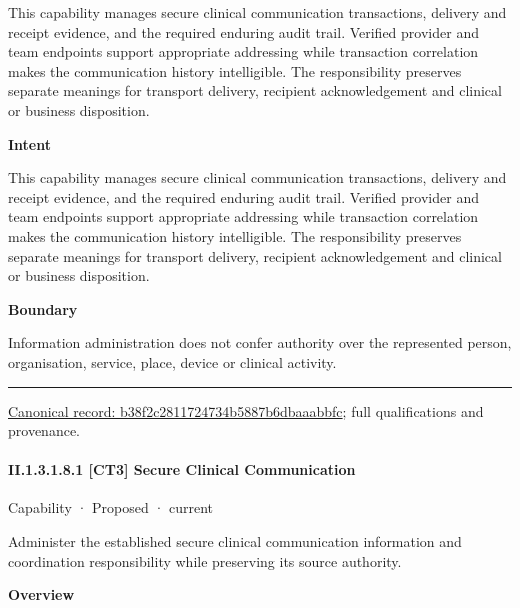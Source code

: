This capability manages secure clinical communication transactions, delivery and receipt evidence, and the required enduring audit trail. Verified provider and team endpoints support appropriate addressing while transaction correlation makes the communication history intelligible. The responsibility preserves separate meanings for transport delivery, recipient acknowledgement and clinical or business disposition.



\textbf{Intent}



This capability manages secure clinical communication transactions, delivery and receipt evidence, and the required enduring audit trail. Verified provider and team endpoints support appropriate addressing while transaction correlation makes the communication history intelligible. The responsibility preserves separate meanings for transport delivery, recipient acknowledgement and clinical or business disposition.



\textbf{Boundary}



Information administration does not confer authority over the represented person, organisation, service, place, device or clinical activity.



\medskip\hrule\medskip

{\footnotesize \href{../../../../../../../continuum/strategy/capability/b38f2c2811724734b5887b6dbaaabbfc.md}{Canonical record: b38f2c2811724734b5887b6dbaaabbfc}; full qualifications and provenance.}\par
\paragraph*{II.1.3.1.8.1 [CT3] Secure Clinical Communication}
\label{navigation:II.1.3.1.8.1}

\label{element:eddb86c7922145439b9dcf0259f4aed5}
{\small Capability · Proposed · current}\par

Administer the established secure clinical communication information and coordination responsibility while preserving its source authority.



\textbf{Overview}




